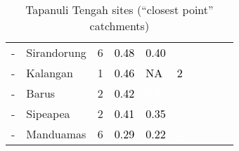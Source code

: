 \begin{table}[ht]
\begin{tabular}{C{0.05\textwidth}C{0.15\textwidth}C{0.08\textwidth}C{0.08\textwidth}C{0.08\textwidth}C{0.08\textwidth}C{0.08\textwidth}C{0.08\textwidth}C{0.08\textwidth}C{0.08\textwidth}}
  {-} & Sirandorung &   6 & \textcolor[HTML]{000000}{0.48} & \textcolor[HTML]{000000}{0.40} & \textcolor[HTML]{FFFFFF}{3} &  &  &  &  \\ 
  {-} & Kalangan &   1 & \textcolor[HTML]{000000}{0.46} & \textcolor[HTML]{000000}{  NA} & \textcolor[HTML]{000000}{2} &  &  &  &  \\ 
  {-} & Barus &   2 & \textcolor[HTML]{000000}{0.42} & \textcolor[HTML]{FFFFFF}{0.48} & \textcolor[HTML]{FFFFFF}{3} &  &  &  &  \\ 
  {-} & Sipeapea &   2 & \textcolor[HTML]{000000}{0.41} & \textcolor[HTML]{000000}{0.35} & \textcolor[HTML]{FFFFFF}{3} &  &  &  &  \\ 
  {-} & Manduamas &   6 & \textcolor[HTML]{000000}{0.29} & \textcolor[HTML]{000000}{0.22} & \textcolor[HTML]{FFFFFF}{3} &  &  &  &  \\ 
  \end{tabular}
\endgroup
\caption{Tapanuli Tengah sites (``closest point'' catchments)} 
\end{table}
